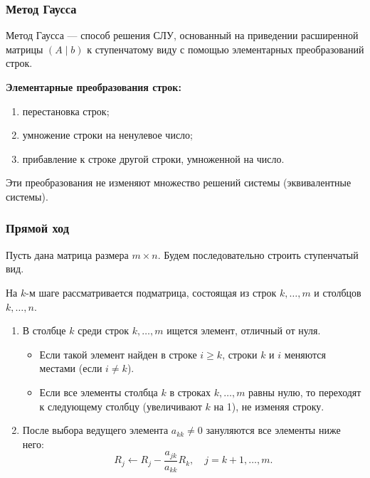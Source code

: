 \documentclass[10pt]{article}
\begin{document}
\subsubsection*{Метод Гаусса}

Метод Гаусса — способ решения СЛУ, основанный на приведении расширенной матрицы \((A \mid b)\) к ступенчатому виду с помощью элементарных преобразований строк.

\begin{definition}
\textbf{Элементарные преобразования строк:}
\begin{enumerate}
    \item перестановка строк;
    \item умножение строки на ненулевое число;
    \item прибавление к строке другой строки, умноженной на число.
\end{enumerate}
\end{definition}

Эти преобразования не изменяют множество решений системы (эквивалентные системы).

\subsubsection*{Прямой ход}

Пусть дана матрица размера \(m \times n\). Будем последовательно строить ступенчатый вид.

На \(k\)-м шаге рассматривается подматрица, состоящая из строк \(k, \dots, m\) и столбцов \(k, \dots, n\).

\begin{enumerate}
    \item В столбце \(k\) среди строк \(k, \dots, m\) ищется элемент, отличный от нуля.
    \begin{itemize}
        \item Если такой элемент найден в строке \(i \ge k\), строки \(k\) и \(i\) меняются местами (если \(i \ne k\)).
        \item Если все элементы столбца \(k\) в строках \(k, \dots, m\) равны нулю, то переходят к следующему столбцу (увеличивают \(k\) на 1), не изменяя строку.
    \end{itemize}
    
    \item После выбора ведущего элемента \(a_{kk} \ne 0\) зануляются все элементы ниже него:
    \[
    R_j \leftarrow R_j - \frac{a_{jk}}{a_{kk}} R_k, \quad j = k+1, \dots, m.
    \]
\end{enumerate}
\end{document}
